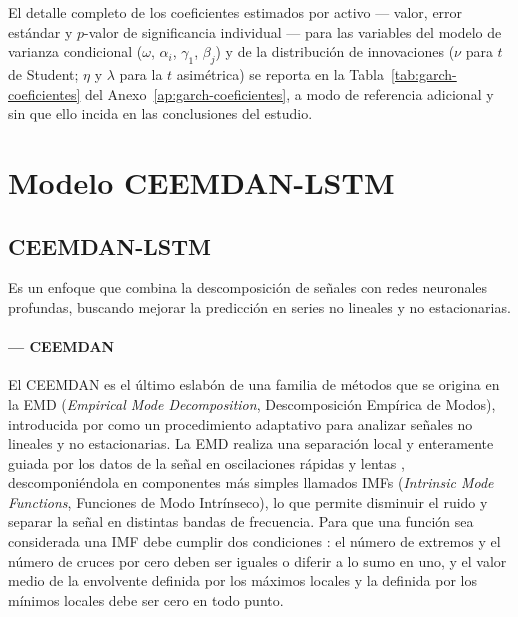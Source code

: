 \documentclass[12pt]{paper}
\begin{document}
El detalle completo de los coeficientes estimados por activo --- valor, error estándar y $p$-valor de significancia individual --- para las variables del modelo de varianza condicional ($\omega$, $\alpha_i$, $\gamma_1$, $\beta_j$) y de la distribución de innovaciones ($\nu$ para $t$ de Student; $\eta$ y $\lambda$ para la $t$ asimétrica) se reporta en la Tabla~\ref{tab:garch-coeficientes} del Anexo~\ref{ap:garch-coeficientes}, a modo de referencia adicional y sin que ello incida en las conclusiones del estudio.


\section{Modelo CEEMDAN-LSTM}
\label{sec:modelo-ceemdan-lstm}

\subsection[CEEMDAN-LSTM]{CEEMDAN-LSTM}

Es un enfoque que combina la descomposición de señales con redes neuronales profundas, buscando mejorar la predicción en series no lineales y no estacionarias.

\paragraph{--- CEEMDAN}
El CEEMDAN es el último eslabón de una familia de métodos que se origina en la EMD (\textit{Empirical Mode Decomposition}, Descomposición Empírica de Modos), introducida por \citet{huang1998emd} como un procedimiento adaptativo para analizar señales no lineales y no estacionarias. La EMD realiza una separación local y enteramente guiada por los datos de la señal en oscilaciones rápidas y lentas \citep{torres2011ceemdan}, descomponiéndola en componentes más simples llamados IMFs (\textit{Intrinsic Mode Functions}, Funciones de Modo Intrínseco), lo que permite disminuir el ruido y separar la señal en distintas bandas de frecuencia. Para que una función sea considerada una IMF debe cumplir dos condiciones \citep{huang1998emd, torres2011ceemdan}: el número de extremos y el número de cruces por cero deben ser iguales o diferir a lo sumo en uno, y el valor medio de la envolvente definida por los máximos locales y la definida por los mínimos locales debe ser cero en todo punto.
\end{document}
